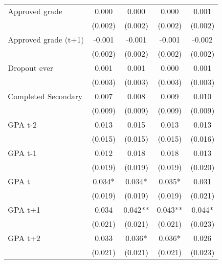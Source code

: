 {{\begin{tabular}{lcccc}
Approved grade      &       0.000   &       0.000   &       0.000   &       0.001   \\
                    &     (0.002)   &     (0.002)   &     (0.002)   &     (0.002)   \\
 
Approved grade (t+1)&      -0.001   &      -0.001   &      -0.001   &      -0.002   \\
                    &     (0.002)   &     (0.002)   &     (0.002)   &     (0.002)   \\
 
Dropout ever        &       0.001   &       0.001   &       0.000   &       0.001   \\
                    &     (0.003)   &     (0.003)   &     (0.003)   &     (0.003)   \\
 
Completed Secondary &       0.007   &       0.008   &       0.009   &       0.010   \\
                    &     (0.009)   &     (0.009)   &     (0.009)   &     (0.009)   \\
 
GPA t-2             &       0.013   &       0.015   &       0.013   &       0.013   \\
                    &     (0.015)   &     (0.015)   &     (0.015)   &     (0.016)   \\
 
GPA t-1             &       0.012   &       0.018   &       0.018   &       0.013   \\
                    &     (0.019)   &     (0.019)   &     (0.019)   &     (0.020)   \\
 
GPA t               &       0.034*  &       0.034*  &       0.035*  &       0.031   \\
                    &     (0.019)   &     (0.019)   &     (0.019)   &     (0.021)   \\
 
GPA t+1             &       0.034   &       0.042** &       0.043** &       0.044*  \\
                    &     (0.021)   &     (0.021)   &     (0.021)   &     (0.023)   \\
 
GPA t+2             &       0.033   &       0.036*  &       0.036*  &       0.026   \\
                    &     (0.021)   &     (0.021)   &     (0.021)   &     (0.023)   \\
 

\end{tabular}}}

